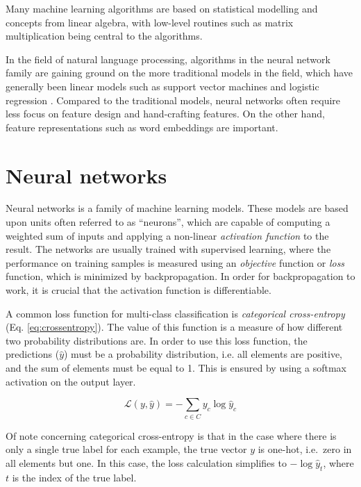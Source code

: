 Many machine learning algorithms are based on statistical modelling and
concepts from linear algebra, with low-level routines such as matrix
multiplication being central to the algorithms.

In the field of natural language processing, algorithms in the neural network
family are gaining ground on the more traditional models in the field,
which have generally been linear models such as support vector machines and
logistic regression \autocite[345]{goldberg2016primer}. Compared to the
traditional models, neural networks often require less focus on feature
design and hand-crafting features. On the other hand, feature representations
such as word embeddings are important.


\section{Neural networks}

Neural networks is a family of machine learning models. These models are
based upon units often referred to as ``neurons'', which are capable of
computing a weighted sum of inputs and applying a non-linear \emph{activation
function} to the result. The networks are usually trained with supervised
learning, where the performance on training samples is measured using an
\emph{objective} function or \emph{loss} function, which is minimized by
backpropagation. In order for backpropagation to work, it is crucial that the
activation function is differentiable.

A common loss function for multi-class classification is \emph{categorical
cross-entropy} (Eq. \ref{eq:crossentropy}). The value of this function is a
measure of how different two probability distributions are. In order to use
this loss function, the predictions ($\hat y$) must be a probability
distribution, i.e. all elements are positive, and the sum of elements must be
equal to 1. This is ensured by using a softmax activation on the output
layer.

\begin{equation}\label{eq:crossentropy}
  \mathcal{L}(y, {\hat y}) = -\sum_{c\in C} {y_c \log{{\hat y}_c}}
\end{equation}

Of note concerning categorical cross-entropy is that in the case where there
is only a single true label for each example, the true vector $y$ is one-hot,
i.e.\ zero in all elements but one. In this case, the loss calculation
simplifies to $-\log{{\hat y}_t}$, where $t$ is the index of the true label.

